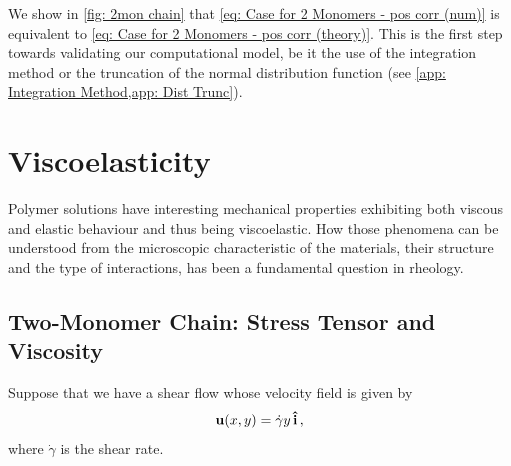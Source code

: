 \documentclass[../../main.tex]{subfiles}
\begin{document}
    We show in \cref{fig: 2mon chain} that \cref{eq: Case for 2 Monomers - pos corr (num)} is equivalent to \cref{eq: Case for 2 Monomers - pos corr (theory)}. This is the first step towards validating our computational model, be it the use of the integration method or the truncation of the normal distribution function (see \cref{app: Integration Method,app: Dist Trunc}).
    
\section{Viscoelasticity}
%
    Polymer solutions have interesting mechanical properties exhibiting both viscous and elastic behaviour and thus being viscoelastic. How those phenomena can be understood from the microscopic characteristic of the materials, their structure and the type of interactions, has been a fundamental question in rheology.
%
\subsection{Two-Monomer Chain: Stress Tensor and Viscosity}
%
    Suppose that we have a shear flow whose velocity field is given by
        \begin{equation}
            \mathbf{u}(x, y) = \Dot{\gamma} y \,\uvec{i} \,,
        \end{equation}
    where $\Dot{\gamma}$ is the shear rate. 
    
\end{document}
